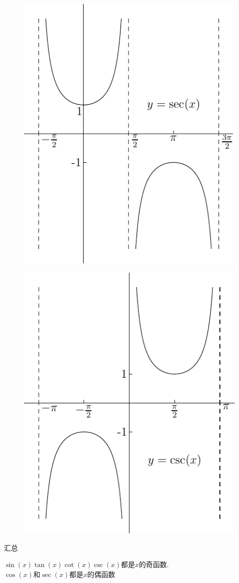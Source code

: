 \begin{figure}[H]
\centering
\includegraphics{sec.pdf}
\end{figure}
\begin{figure}[H]
\centering
\includegraphics{csc.pdf}
\end{figure}
汇总
\begin{center}
\begin{boxedminipage}{8cm}
	$\sin(x)$\caesura$\tan(x)$\caesura$\cot(x)$\caesura$\csc(x)$都是$x$的奇函数.\\
	$\cos(x)$和$\sec(x)$都是$x$的偶函数
\end{boxedminipage}
\end{center}\vspace{8ex}

